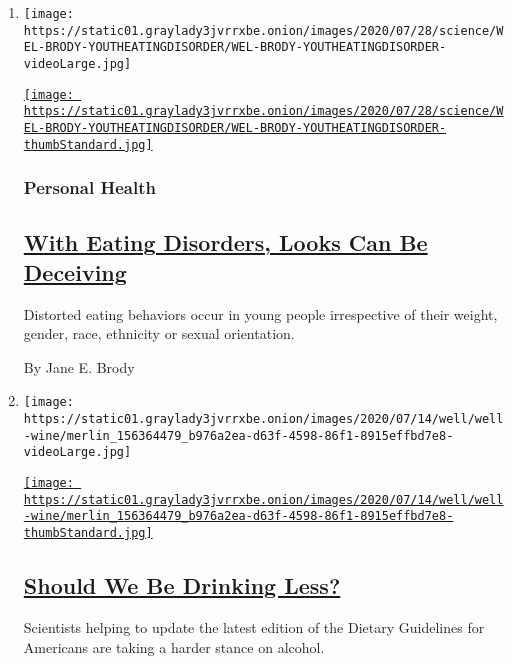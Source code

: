 \begin{enumerate}
\def\labelenumi{\arabic{enumi}.}
\item
  \texttt{[image: https://static01.graylady3jvrrxbe.onion/images/2020/07/28/science/WEL-BRODY-YOUTHEATINGDISORDER/WEL-BRODY-YOUTHEATINGDISORDER-videoLarge.jpg]}

  \href{/2020/07/27/well/eat/eating-disorders.html}{\texttt{[image: https://static01.graylady3jvrrxbe.onion/images/2020/07/28/science/WEL-BRODY-YOUTHEATINGDISORDER/WEL-BRODY-YOUTHEATINGDISORDER-thumbStandard.jpg]}}

  \hypertarget{personal-health}{%
  \subsubsection{Personal Health}\label{personal-health}}

  \hypertarget{with-eating-disorders-looks-can-be-deceiving}{%
  \subsection{\texorpdfstring{\href{/2020/07/27/well/eat/eating-disorders.html}{With
  Eating Disorders, Looks Can Be
  Deceiving}}{With Eating Disorders, Looks Can Be Deceiving}}\label{with-eating-disorders-looks-can-be-deceiving}}

  Distorted eating behaviors occur in young people irrespective of their
  weight, gender, race, ethnicity or sexual orientation.

  By Jane E. Brody
\item
  \texttt{[image: https://static01.graylady3jvrrxbe.onion/images/2020/07/14/well/well-wine/merlin\_156364479\_b976a2ea-d63f-4598-86f1-8915effbd7e8-videoLarge.jpg]}

  \href{/2020/07/10/well/eat/should-we-be-drinking-less.html}{\texttt{[image: https://static01.graylady3jvrrxbe.onion/images/2020/07/14/well/well-wine/merlin\_156364479\_b976a2ea-d63f-4598-86f1-8915effbd7e8-thumbStandard.jpg]}}

  \hypertarget{should-we-be-drinking-less}{%
  \subsection{\texorpdfstring{\href{/2020/07/10/well/eat/should-we-be-drinking-less.html}{Should
  We Be Drinking
  Less?}}{Should We Be Drinking Less?}}\label{should-we-be-drinking-less}}

  Scientists helping to update the latest edition of the Dietary
  Guidelines for Americans are taking a harder stance on alcohol.


\end{enumerate}
